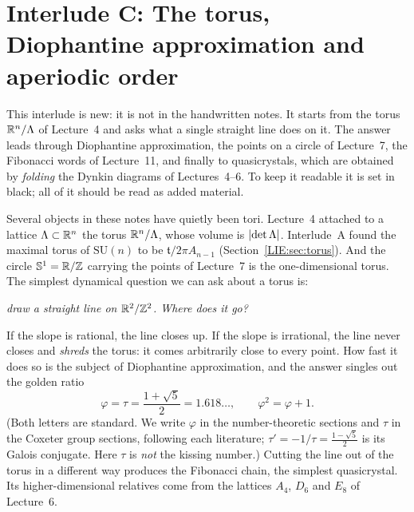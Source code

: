 

\chapter[Interlude C: Torus and aperiodic order]{Interlude C: The torus, Diophantine approximation and aperiodic order}
\label{ERG:ch}

\begin{addedblock}
This interlude is new: it is not in the handwritten notes. It starts from the torus $\mathbb{R}^n/\Lambda$ of
Lecture~4 and asks what a single straight line does on it. The answer leads through Diophantine
approximation, the points on a circle of Lecture~7, the Fibonacci words of Lecture~11, and finally
to quasicrystals, which are obtained by \emph{folding} the Dynkin diagrams of Lectures~4--6. To keep
it readable it is set in black; all of it should be read as added material.
\end{addedblock}

Several objects in these notes have quietly been tori. Lecture~4 attached to a lattice $\Lambda\subset\mathbb{R}^n$
the torus $\mathbb{R}^n/\Lambda$, whose volume is $\left\lvert \det\Lambda \right\rvert$. Interlude~A found the maximal torus of
$\mathrm{SU}(n)$ to be $\mathfrak t/2\pi A_{n-1}$ (Section~\ref{LIE:sec:torus}). And the circle
$\mathbb{S}^1=\mathbb{R}/\mathbb{Z}$ carrying the points of Lecture~7 is the one-dimensional torus. The simplest dynamical
question we can ask about a torus is:
\begin{center}
\emph{draw a straight line on $\mathbb{R}^2/\mathbb{Z}^2$. Where does it go?}
\end{center}
If the slope is rational, the line closes up. If the slope is irrational, the line never closes and
\emph{shreds} the torus: it comes arbitrarily close to every point. How fast it does so is the subject
of Diophantine approximation, and the answer singles out the golden ratio
\[
  \varphi=\tau=\frac{1+\sqrt5}2=1.618\ldots,\qquad \varphi^2=\varphi+1 .
\]
(Both letters are standard. We write $\varphi$ in the number-theoretic sections and $\tau$ in the
Coxeter group sections, following each literature; $\tau'=-1/\tau=\frac{1-\sqrt5}{2}$ is its Galois
conjugate. Here $\tau$ is \emph{not} the kissing number.) Cutting the line out of the torus in a
different way produces the Fibonacci chain, the simplest quasicrystal. Its higher-dimensional
relatives come from the lattices $A_4$, $D_6$ and $E_8$ of Lecture~6.

